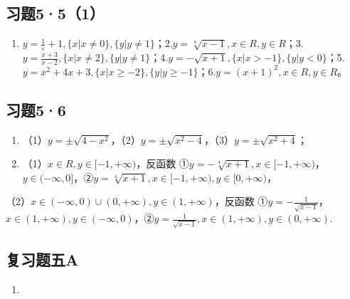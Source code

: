 \subsection{习题5·5（1）}

\begin{enumerate}[start=1]
\item
  \(y = \frac{1}{\varepsilon} + 1, \{x | x \neq 0\}, \{y | y \neq 1\}\)；2.\(y = \sqrt[4]{x - 1}, x \in R,\)\(y \in R\)；3.\(y = \frac{x + 3}{x - 2}, \{x | x \neq 2\}, \{y | y \neq 1\}\)；4.\(y = -\sqrt{x + 1}, \{x | x > -1\},\)\(\{y | y < 0\}\)；5.\(y = x^2 + 4x + 3, \{x | x \geqslant -2\}, \{y | y \geqslant -1\}\)；6.\(y = (x + 1)^2, x \in R, y \in R\)。
\end{enumerate}

\subsection{习题5·6}

\begin{enumerate}
\item
  （1）\(y = \pm \sqrt{4 - x^2}\)，（2）\(y = \pm \sqrt{x^2 - 4}\)，（3）\(y = \pm \sqrt{x^2 + 4}\)；
\item
  （1）\(x \in R, y \in [-1, +\infty)\)，反函数
  ①\(y = -\sqrt[4]{x + 1}, x \in [-1, +\infty)\)，\(y \in (-\infty, 0]\)，②\(y = \sqrt[4]{x + 1}, x \in [-1, +\infty), y \in [0, +\infty)\)，
\end{enumerate}

（2）\(x \in (-\infty, 0) \cup (0, +\infty), y \in (1, +\infty)\)，反函数
①\(y = -\frac{1}{\sqrt{x - 1}}\)，\(x \in (1, +\infty), y \in (-\infty, 0)\)，②\(y = \frac{1}{\sqrt{x - 1}}, x \in (1, +\infty), y \in (0, +\infty).\)

\subsection{复习题五A}

\begin{enumerate}[start=4]
\item
\end{enumerate}

